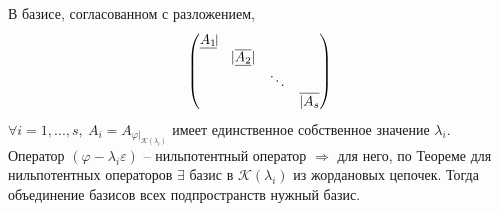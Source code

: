 \documentclass[a4paper, 12pt]{article}
\theoremstyle{definition}
\begin{document}
    В базисе, согласованном с разложением,
    $$\begin{pmatrix}
        \underline{A_1\vline} & \null & \null & \null\\
        \null  & |\overline{\underline{A_2}}| & \null & \null\\
        \null & \null & \ddots & \null\\
        \null & \null & \null & \overline{|A_s} 
    \end{pmatrix}$$
    $\forall i = 1,...,s,\ A_i = A_{\varphi|_{\mathcal{K}
    (\lambda_i)}}$ имеет единственное собственное значение 
    $\lambda_i.$\\ Оператор $(\varphi - \lambda_i \varepsilon)$
    -- нильпотентный оператор $\Longrightarrow $ для него,
    по Теореме для нильпотентных операторов $\exists$ базис
    в $\mathcal{K}(\lambda_i)$  из жордановых цепочек.
    Тогда объединение базисов всех подпространств нужный базис.
\end{document}
